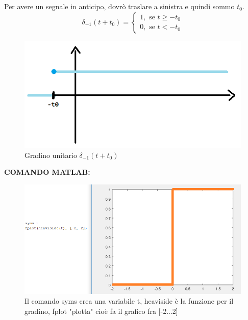 	Per avere un segnale in anticipo, dovrò traslare a sinistra e quindi sommo $t_0$.\\
	
	\begin{equation*}
	\delta_{-1}(t + t_0)=
	\begin{cases} 
	1, \mbox{ se } t \geq -t_0\\ 
	0, \mbox{ se } t < -t_0
	\end{cases} 
	\end{equation*}
	
	\begin{figure}[h]
		\centering
		\includegraphics[scale=0.5]{immagini/gradinoContinuoPiu}
		\caption{ Gradino unitario $ \delta_{-1}(t + t_0 ) $ }
		\label{fig: gradinoContinuoPiu}
	\end{figure}
	
\pagebreak
	
	\textbf{COMANDO MATLAB:}\\
	
	\begin{figure}[h]
		\centering
		\includegraphics[scale=0.75]{immagini/comando2}
		\caption{ Il comando syms crea una variabile t, heaviside è la funzione per il gradino, fplot "plotta" cioè fa il grafico fra [-2...2]  }
		\label{fig: comando2}
	\end{figure}
	
